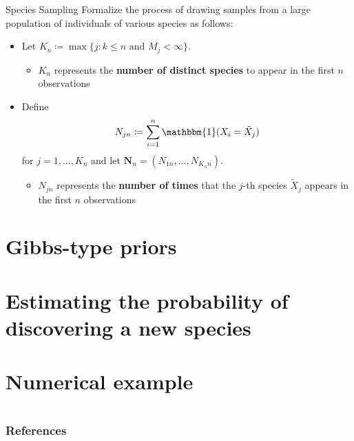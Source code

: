 \documentclass[11pt, handout]{beamer}
\begin{document}
\begin{frame}[t]{Species Sampling}
    Formalize the process of drawing samples from a large population of individuals of various species as follows:
    \begin{itemize}
        \item<1-> Let \(K_n \coloneqq \max\{j \colon k \leq n \text{ and } M_j < \infty\}\).
        \begin{itemize}
            \item \(K_n\) represents the \textbf{number of distinct species} to appear in the first \(n\) observations
        \end{itemize}
        \item<2-> Define
        \begin{equation*}
            N_{jn} \coloneqq \sum_{i=1}^n \mathbbm{1}(X_i = \tilde{X}_j)
        \end{equation*}
        for \(j = 1,...,K_n\) and let \(\mathbf{N}_{n} = (N_{1n},...,N_{K_n n})\).
        \begin{itemize}
            \item \(N_{jn}\) represents the \textbf{number of times} that the \(j\)-th species \(\tilde{X}_j\) appears in the first \(n\) observations
        \end{itemize}
    \end{itemize}
\end{frame}

\section{Gibbs-type priors}

\section{Estimating the probability of discovering a new species}

\section{Numerical example}

\section*{}
\begin{frame}[allowframebreaks] %
\frametitle{References}
\scriptsize{}

\end{frame}
 
\end{document}
